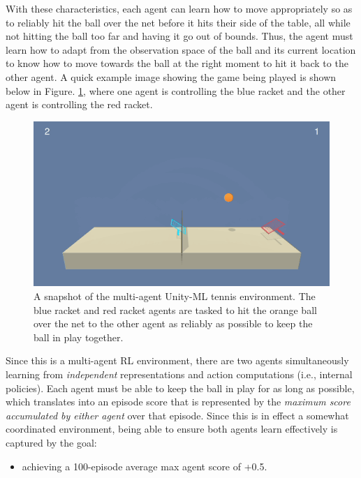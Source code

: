 \documentclass[11pt]{article}
\begin{document}
	\FloatBarrier
	
	With these characteristics, each agent can learn how to move appropriately so as to reliably hit the ball over the net before it hits their side of the table, all while not hitting the ball too far and having it go out of bounds. Thus, the agent must learn how to adapt from the observation space of the ball and its current location to know how to move towards the ball at the right moment to hit it back to the other agent. A quick example image showing the game being played is shown below in Figure. \ref{fig:example-game-image}, where one agent is controlling the blue racket and the other agent is controlling the red racket.
	
	\begin{figure}[!ht]
		\centering
		\includegraphics[width=0.75\linewidth]{images/example-env-image.png}
		\caption{A snapshot of the multi-agent Unity-ML tennis environment. The blue racket and red racket agents are tasked to hit the orange ball over the net to the other agent as reliably as possible to keep the ball in play together.}
		\label{fig:example-game-image}
	\end{figure}
	
	\FloatBarrier
	
	Since this is a multi-agent RL environment, there are two agents simultaneously learning from \textit{independent} representations and action computations (i.e., internal policies). Each agent must be able to keep the ball in play for as long as possible, which translates into an episode score that is represented by the \textit{maximum score accumulated by either agent} over that episode. Since this is in effect a somewhat coordinated environment, being able to ensure both agents learn effectively is captured by the goal:
	\begin{itemize}
		\item achieving a 100-episode average max agent score of +0.5.
	\end{itemize}
	
\end{document}
